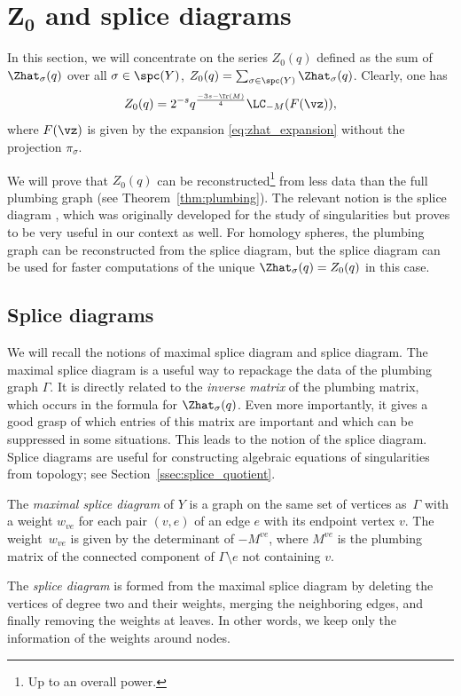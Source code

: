 \documentclass[pdftex]{sigma}
\begin{document}
\section[Z\_0 and splice diagrams]{$\boldsymbol{Z_0}$ and splice diagrams}\label{sec:splice}

In this section, we will concentrate on the series $Z_0(q)$ defined as the sum of $\Zhat_\sigma(q)$ over all $\sigma \in \spc(Y)$,
$Z_0(q) = \sum_{\sigma \in \spc(Y)} \Zhat_\sigma(q)$.
Clearly, one has
\[
	Z_0(q) =
	2^{-s} q^{\frac{-3s-\Tr(M)}{4}} \LC_{-M}(F(\vz )),
\]
where $F(\vz )$ is given by the expansion \eqref{eq:zhat_expansion} without the projection $\pi_\sigma$.

We will prove that $Z_0(q)$ can be reconstructed\footnote{Up to an overall power.} from less data than the full plumbing graph (see Theorem~\ref{thm:plumbing}). The relevant notion is the splice diagram \cite{EN86,Neu81,Sie80}, which was originally developed for the study of singularities but proves to be very useful in our context as well. For homology spheres, the plumbing graph can be reconstructed from the splice diagram, but the splice diagram can be used for faster computations of the unique $\Zhat_\sigma(q) = Z_0(q)$ in this case.

\subsection{Splice diagrams}\label{ssec:splice_diagrams}

We will recall the notions of maximal splice diagram and splice diagram. The maximal splice diagram \cite{NW05a} is a useful way to repackage the data of the plumbing graph $\Gamma$. It is directly related to the \emph{inverse matrix} of the plumbing matrix, which occurs in the formula for $\Zhat_{\sigma} (q)$. Even more importantly, it gives a good grasp of which entries of this matrix are important and which can be suppressed in some situations. This leads to the notion of the splice diagram. Splice diagrams are useful for constructing algebraic equations of singularities from topology; see Section~\ref{ssec:splice_quotient}.

\begin{Definition}
	The \emph{maximal splice diagram} of $Y$ is a graph on the same set of vertices as~$\Gamma$ with a weight $w_{ve}$ for each pair $(v, e)$ of an edge $e$ with its endpoint vertex $v$. The weight~$w_{ve}$ is given by the determinant of $-M^{ve}$, where $M^{ve}$ is the plumbing matrix of the connected component of $\Gamma{\setminus}e$ not containing $v$.

	The \emph{splice diagram} is formed from the maximal splice diagram by deleting the vertices of degree two and their weights, merging the neighboring edges, and finally removing the weights at leaves. In other words, we keep only the information of the weights around nodes.
\end{Definition}
\end{document}
